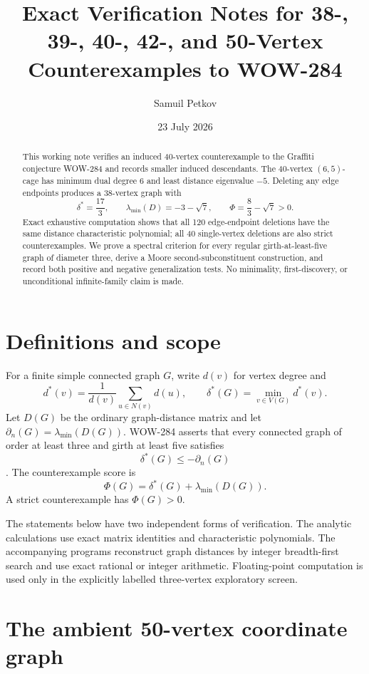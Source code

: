 \documentclass[11pt,reqno]{amsart}
\title[Further exact counterexamples to WOW-284]
{Exact Verification Notes for 38-, 39-, 40-, 42-, and 50-Vertex Counterexamples to WOW-284}
\author{Samuil Petkov}
\date{23 July 2026}
\newcommand{\PhiScore}{\Phi}
\theoremstyle{plain}
\theoremstyle{definition}
\theoremstyle{remark}
\begin{document}
\begin{abstract}
This working note verifies an induced 40-vertex counterexample to the Graffiti
conjecture WOW-284 and records smaller induced descendants.  The 40-vertex
$(6,5)$-cage has minimum dual degree $6$ and least distance eigenvalue $-5$.
Deleting any edge endpoints produces a 38-vertex graph with
\[
 \delta^*=\frac{17}{3},\qquad
 \lambda_{\min}(D)=-3-\sqrt7,
 \qquad
 \PhiScore=\frac83-\sqrt7>0.
\]
Exact exhaustive computation shows that all 120 edge-endpoint deletions have
the same distance characteristic polynomial; all 40 single-vertex deletions
are also strict counterexamples.  We prove a spectral criterion for every
regular girth-at-least-five graph of diameter three, derive a Moore
second-subconstituent construction, and record both positive and negative
generalization tests.  No minimality, first-discovery, or unconditional
infinite-family claim is made.
\end{abstract}

\maketitle
\tableofcontents

\section{Definitions and scope}

For a finite simple connected graph $G$, write $d(v)$ for vertex degree and
\[
 d^*(v)=\frac1{d(v)}\sum_{u\in N(v)}d(u),
 \qquad
 \delta^*(G)=\min_{v\in V(G)}d^*(v).
\]
Let $D(G)$ be the ordinary graph-distance matrix and let
$\partial_n(G)=\lambda_{\min}(D(G))$.  WOW-284 asserts that every connected
graph of order at least three and girth at least five satisfies
\[
 \delta^*(G)\le -\partial_n(G)
\]
\cite[Conjecture~7.16]{AouchicheHansen2014}.  The counterexample score is
\[
 \PhiScore(G)=\delta^*(G)+\lambda_{\min}(D(G)).
\]
A strict counterexample has $\PhiScore(G)>0$.

The statements below have two independent forms of verification.  The
analytic calculations use exact matrix identities and characteristic
polynomials.  The accompanying programs reconstruct graph distances by
integer breadth-first search and use exact rational or integer arithmetic.
Floating-point computation is used only in the explicitly labelled
three-vertex exploratory screen.

\section{The ambient 50-vertex coordinate graph}
\end{document}
